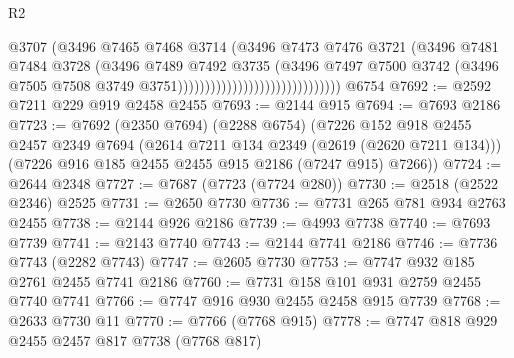 \begin{lexlean}{R2}
\begin{coremodule}
                                                    @3707
                                                    (@3496
                                                      @7465
                                                      @7468
                                                      @3714
                                                      (@3496
                                                        @7473
                                                        @7476
                                                        @3721
                                                        (@3496
                                                          @7481
                                                          @7484
                                                          @3728
                                                          (@3496
                                                            @7489
                                                            @7492
                                                            @3735
                                                            (@3496
                                                              @7497
                                                              @7500
                                                              @3742
                                                              (@3496
                                                                @7505
                                                                @7508
                                                                @3749
                                                                @3751))))))))))))))))))))))))))))))
    @6754
@7692 := @2592 @7211 @229 @919 @2458 @2455
@7693 := @2144 @915
@7694 := @7693 @2186
@7723 := @7692
    (@2350 @7694)
    (@2288 @6754)
    (@7226
      @152
      @918
      @2455
      @2457
      @2349
      @7694
      (@2614 @7211 @134 @2349 (@2619 (@2620 @7211 @134)))
      (@7226 @916 @185 @2455 @2455 @915 @2186 (@7247 @915) @7266))
@7724 := @2644 @2348
@7727 := @7687 (@7723 (@7724 @280))
@7730 := @2518 (@2522 @2346) @2525
@7731 := @2650 @7730
@7736 := @7731 @265 @781 @934 @2763 @2455
@7738 := @2144 @926 @2186
@7739 := @4993 @7738
@7740 := @7693 @7739
@7741 := @2143 @7740
@7743 := @2144 @7741 @2186
@7746 := @7736 @7743 (@2282 @7743)
@7747 := @2605 @7730
@7753 := @7747 @932 @185 @2761 @2455 @7741 @2186
@7760 := @7731 @158 @101 @931 @2759 @2455 @7740 @7741
@7766 := @7747 @916 @930 @2455 @2458 @915 @7739
@7768 := @2633 @7730 @11
@7770 := @7766 (@7768 @915)
@7778 := @7747 @818 @929 @2455 @2457 @817 @7738 (@7768 @817)

\end{coremodule}
\end{lexlean}
